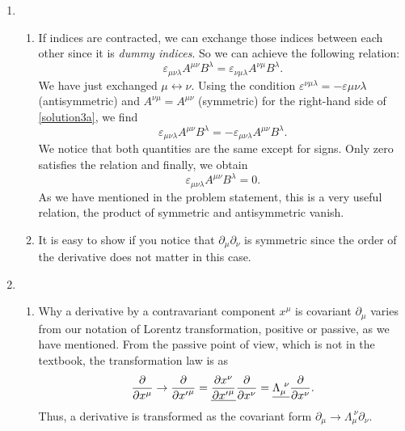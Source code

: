 \documentclass[a4paper,pdftex]{article}
\begin{document}
\begin{enumerate}
   \item 
   \begin{enumerate}
      \item 
      If indices are contracted, we can exchange those indices between each other since it is \textit{dummy indices}. So we can achieve the following relation:
      \begin{equation}
         \varepsilon_{\mu\nu\lambda}A^{\mu\nu}B^{\lambda}
         =
         \varepsilon_{\nu\mu\lambda}A^{\nu\mu}B^{\lambda}
         .
         \label{solution3a}
      \end{equation}
      We have just exchanged $\mu\leftrightarrow\nu$. Using the condition $\varepsilon^{\nu\mu\lambda}=-\varepsilon\mu\nu\lambda$ (antisymmetric) and $A^{\nu\mu}=A^{\mu\nu}$ (symmetric) for the right-hand side of \eqref{solution3a}, we find
      \begin{equation}
         \varepsilon_{\mu\nu\lambda}A^{\mu\nu}B^{\lambda}
         =
         -
         \varepsilon_{\mu\nu\lambda}A^{\mu\nu}B^{\lambda}
         .
      \end{equation}
      We notice that both quantities are the same except for signs. Only zero satisfies the relation and finally, we obtain
      \begin{equation}
         \varepsilon_{\mu\nu\lambda}A^{\mu\nu}B^{\lambda}
         =
         0
         .
      \end{equation}
      As we have mentioned in the problem statement, this is a very useful relation, the product of symmetric and antisymmetric vanish.

      \item 
      It is easy to show if you notice that $\partial_{\mu}\partial_{\nu}$ is symmetric since the order of the derivative does not matter in this case.
   \end{enumerate}

   \item 
   \begin{enumerate}
      \item 
      Why a derivative by a contravariant component $x^{\mu}$ is covariant $\partial_{\mu}$ varies from our notation of Lorentz transformation, positive or passive, as we have mentioned. From the passive point of view, which is not in the textbook, the transformation law is as
      \begin{equation}
         \pdv{}{x^{\mu}}
         \rightarrow
         \pdv{}{{x'}^{\mu}}
         =
         \uline{
            \pdv{x^{\nu}}{{x'}^{\mu}}
         }
         \pdv{}{x^{\nu}}
         =
         \uline{
            \Lambda_{\mu}^{\ \nu}
         }
         \pdv{}{x^{\nu}}
         .
      \end{equation}
      Thus, a derivative is transformed as the covariant form $\partial_{\mu}\rightarrow\Lambda_{\mu}^{\ \nu}\partial_{\nu}$.


\end{enumerate}
\end{enumerate}
\end{document}
